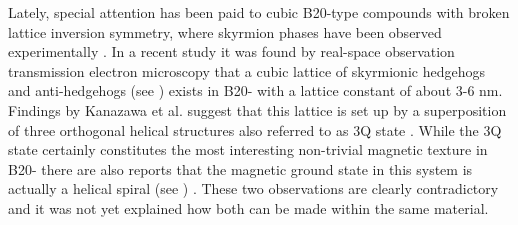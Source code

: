 \documentclass [a4paper, 12pt]{article}
\begin{document}
Lately, special attention has been paid to cubic B20-type compounds with broken lattice inversion symmetry,
where skyrmion phases have been observed experimentally \cite{nagaosa_topological_2013}.
In a recent study \cite{tanigaki_real-space_2015} it was 
found by real-space observation transmission electron microscopy that a cubic lattice of skyrmionic hedgehogs
and anti-hedgehogs (see ) exists in B20- 
with a lattice constant of about 3-6 nm.
Findings by Kanazawa et al. suggest that this lattice is set up by a superposition of three orthogonal
helical structures also referred to as 3Q state \cite{kanazawa_noncentrosymmetric_2017}. 
While the 3Q state certainly constitutes the most interesting non-trivial magnetic texture 
in B20- there are also reports that the magnetic ground state in this system is
actually a helical spiral (see ) \cite{yaouanc_magnetic_2017}.
These two observations are clearly contradictory and it was not yet explained how
both can be made within the same material.
\end{document}
